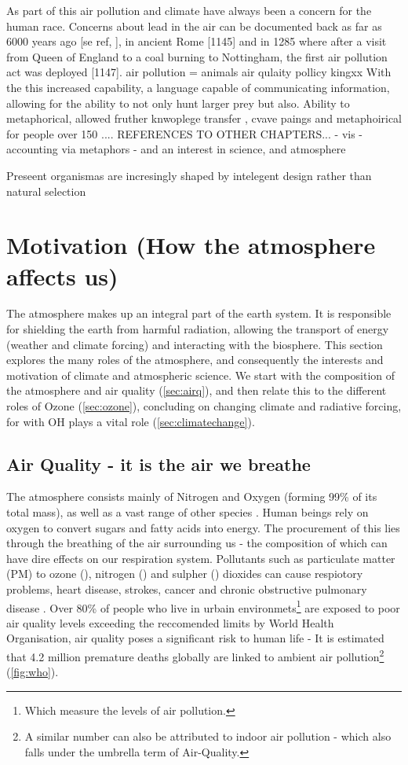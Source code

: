 As part of this air pollution and climate have always been a concern for the human race. Concerns about lead in the air can be documented back as far as 6000 years ago [se ref, ], in ancient Rome [1145] and in 1285 where after a visit from Queen of England to a coal burning to Nottingham, the first air pollution act was deployed [1147].
air pollution = animals
air qulaity pollicy
kingxx
With the this increased capability, a language capable of communicating information, allowing for the ability to not only hunt larger prey but also.
Ability to metaphorical, allowed fruther knwoplege transfer , cvave paings and metaphoirical for people over 150 ....
REFERENCES TO OTHER CHAPTERS...
- vis
- accounting via metaphors
- and an interest in science, and atmosphere



Preseent organismas are incresingly shaped by intelegent design rather than natural selection



\section{Motivation (How the atmosphere affects us)}
The atmosphere makes up an integral part of the earth system. It is responsible for shielding the earth from harmful radiation, allowing the transport of energy (weather and climate forcing) and interacting with the biosphere. This section explores the many roles of the atmosphere, and consequently the interests and motivation of climate and atmospheric science. We start with the composition of the atmosphere and air quality (\autoref{sec:airq}), and then relate this to the different roles of Ozone (\autoref{sec:ozone}), concluding on changing climate and radiative forcing, for with OH plays a vital role (\autoref{sec:climatechange}).



\subsection{Air Quality - it is the air we breathe}\label{sec:airq}
The atmosphere consists mainly of Nitrogen and Oxygen (forming 99\% of its total mass), as well as a vast range of other species \citep{ac}. Human beings rely on oxygen to convert sugars and fatty acids into energy. The procurement of this lies through the breathing of the air surrounding us - the composition of which can have dire effects on our respiration system. Pollutants such as particulate matter (PM) to ozone (), nitrogen () and sulpher () dioxides can cause respiotory problems, heart disease, strokes, cancer and chronic obstructive pulmonary disease \cite{who}. Over 80\% of people who live in urbain environmets\footnote{Which measure the levels of air pollution.} are exposed to poor air quality levels exceeding the reccomended limits by World Health Organisation, air quality poses a significant risk to human life - It is estimated that 4.2 million premature deaths globally are linked to ambient air pollution\footnote{A similar number can also be attributed to indoor air pollution - which also falls under the umbrella term of Air-Quality.} (\autoref{fig:who}).

